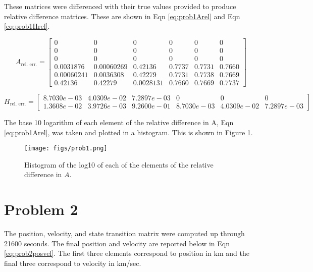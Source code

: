 \documentclass[11pt]{article}
\begin{document}
These matrices were differenced with their true values provided to produce relative difference matrices. These are shown in Eqn \eqref{eq:prob1Arel} and Eqn \eqref{eq:prob1Hrel}.

\begin{equation}
\label{eq:prob1Arel}
A_{\text{rel. err.}} = \left[\begin{array}{cccccc} 0 & 0 & 0 & 0 & 0 & 0\\ 0 & 0 & 0 & 0 & 0 & 0\\ 0 & 0 & 0 & 0 & 0 & 0\\ 0.0031876 & 0.00060269 & 0.42136 & 0.7737 & 0.7731 & 0.7660\\ 0.00060241 & 0.0036308 & 0.42279 & 0.7731 & 0.7738 & 0.7669\\ 0.42136 & 0.42279 & 0.0028131 & 0.7660 & 0.7669 & 0.7737 \end{array}\right]
\end{equation}

\begin{equation}
\label{eq:prob1Hrel}
H_{\text{rel. err.}} = \begin{bmatrix}
8.7030e-03 &  4.0309e-02  & 7.2897e-03    &        0   &         0    &        0 \\
1.3608e-02 &  3.9726e-03  & 9.2600e-01  & 8.7030e-03  & 4.0309e-02 &  7.2897e-03
\end{bmatrix}
\end{equation}

The base 10 logarithm of each element of the relative difference in A, Eqn \eqref{eq:prob1Arel}, was taken and plotted in a histogram. This is shown in Figure \ref{fig:prob1A}.

\begin{figure}[!htb]
	\centering
	\texttt{[image: figs/prob1.png]}
	\caption{Histogram of the log10 of each of the elements of the relative difference in $A$.}
	\label{fig:prob1A}
\end{figure}

\section{Problem 2}

The position, velocity, and state transition matrix were computed up through 21600 seconds. The final position and velocity are reported below in Eqn \eqref{eq:prob2posvel}. The first three elements correspond to position in km and the final three correspond to velocity in km/sec.
\end{document}
